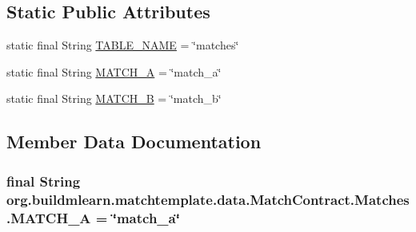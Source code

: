 \subsection*{Static Public Attributes}
\begin{DoxyCompactItemize}
\item 
static final String \hyperlink{classorg_1_1buildmlearn_1_1matchtemplate_1_1data_1_1MatchContract_1_1Matches_a5d5f9f2b24b3e3e42792077a8d037149}{T\+A\+B\+L\+E\+\_\+\+N\+A\+ME} = \char`\"{}matches\char`\"{}
\item 
static final String \hyperlink{classorg_1_1buildmlearn_1_1matchtemplate_1_1data_1_1MatchContract_1_1Matches_a92dddc965b72ed4609a1f948b856870e}{M\+A\+T\+C\+H\+\_\+A} = \char`\"{}match\+\_\+a\char`\"{}
\item 
static final String \hyperlink{classorg_1_1buildmlearn_1_1matchtemplate_1_1data_1_1MatchContract_1_1Matches_a06832aeb0508d8b24c0da2822feeeca5}{M\+A\+T\+C\+H\+\_\+B} = \char`\"{}match\+\_\+b\char`\"{}
\end{DoxyCompactItemize}


\subsection{Member Data Documentation}
\subsubsection[{\texorpdfstring{M\+A\+T\+C\+H\+\_\+A}{MATCH_A}}]{\setlength{\rightskip}{0pt plus 5cm}final String org.\+buildmlearn.\+matchtemplate.\+data.\+Match\+Contract.\+Matches.\+M\+A\+T\+C\+H\+\_\+A = \char`\"{}match\+\_\+a\char`\"{}\hspace{0.3cm}{\ttfamily [static]}}\hypertarget{classorg_1_1buildmlearn_1_1matchtemplate_1_1data_1_1MatchContract_1_1Matches_a92dddc965b72ed4609a1f948b856870e}{}\label{classorg_1_1buildmlearn_1_1matchtemplate_1_1data_1_1MatchContract_1_1Matches_a92dddc965b72ed4609a1f948b856870e}
